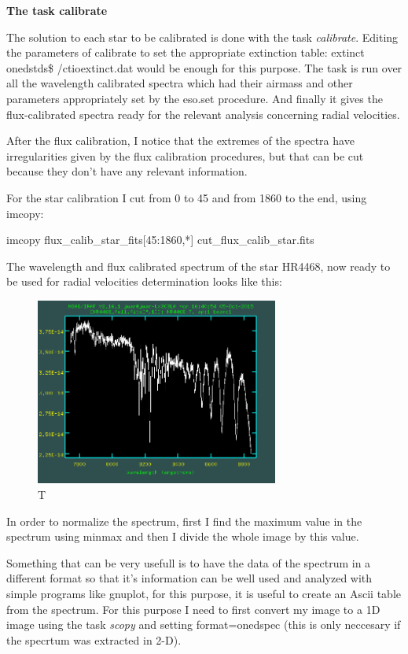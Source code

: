 \textbf{The task calibrate}

The solution to each star to be calibrated is done with the task \textit{calibrate}. Editing the parameters of calibrate to set the appropriate extinction table: extinct onedstds\$ /ctioextinct.dat would be enough for this purpose. The task is run over all the wavelength calibrated spectra which had their airmass and other parameters appropriately set by the eso.set procedure. And finally it gives the flux-calibrated spectra ready for the relevant analysis concerning radial velocities.

After the flux calibration, I notice that the extremes of the spectra have irregularities given by the flux calibration procedures, but that can be cut because they don't have any relevant information.

For the star calibration I cut from 0 to 45 and from 1860 to the end, using imcopy:

\begin{center}
imcopy flux\_calib\_star\_fits[45:1860,*] cut\_flux\_calib\_star.fits
\end{center}

The wavelength and flux calibrated spectrum of the star HR4468, now ready to be used for radial velocities determination looks like this:

\begin{figure}[H]
\centering
\includegraphics[width=8cm]{images/calib_star_flux.png}
\caption{T}
\end{figure}

In order to normalize the spectrum, first I find the maximum value in the spectrum using minmax and then I divide the whole image by this value. 

Something that can be very usefull is to have the data of the spectrum in a different format so that it's information can be well used and analyzed with simple programs like gnuplot, for this purpose, it is useful to create an Ascii table from the spectrum. For this purpose I need to first convert my image to a 1D image using the task \textit{scopy} and setting format=onedspec (this is only neccesary if the specrtum was extracted in 2-D).

